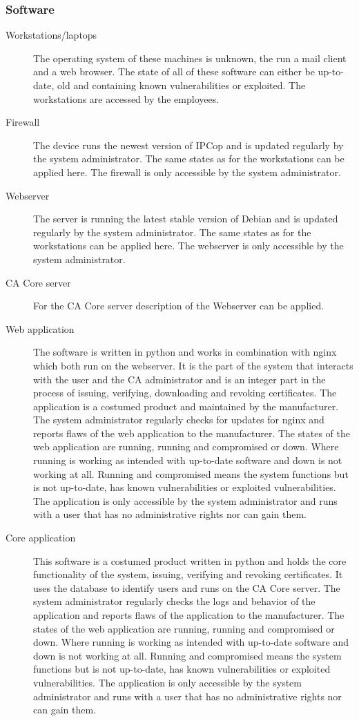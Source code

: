 \documentclass[a4paper, toc=index, 12pt, DIV14, twoside, BCOR2cm, headsepline, numbers=noenddot, bibliography=totoc]{scrbook}
\begin{document}
\subsubsection{Software}
\begin{description}
\item[Workstations/laptops ] The operating system of these machines is unknown, the run a mail client and a web browser. The state of all of these software can either be up-to-date, old and containing known vulnerabilities or exploited. The workstations are accessed by the employees.
\item[Firewall ] The device runs the newest version of IPCop and is updated regularly by the system administrator. The same states as for the workstations can be applied here. The firewall is only accessible by the system administrator.
\item[Webserver ] The server is running the latest stable version of Debian and is updated regularly by the system administrator. The same states as for the workstations can be applied here. The webserver is only accessible by the system administrator.
\item[CA Core server ] For the CA Core server description of the Webserver can be applied. 
\item[Web application ] The software is written in python and works in combination with nginx which both run on the webserver. It is the part of the system that interacts with the user and the CA administrator and is an integer part in the process of issuing, verifying, downloading and revoking certificates. The application is a costumed product and maintained by the manufacturer. The system administrator regularly checks for updates for nginx and reports flaws of the web application to the manufacturer. The states of the web application are running, running and compromised or down. Where running is working as intended with up-to-date software and down is not working at all. Running and compromised means the system functions but is not up-to-date, has known vulnerabilities or exploited vulnerabilities. The application is only accessible by the system administrator and runs with a user that has no administrative rights nor can gain them.
\item[Core application ] This software is a costumed product written in python and holds the core functionality of the system, issuing, verifying and revoking certificates. It uses the database to identify users and runs on the CA Core server. The system administrator regularly checks the logs and behavior of the application and reports flaws of the application to the manufacturer. The states of the web application are running, running and compromised or down. Where running is working as intended with up-to-date software and down is not working at all. Running and compromised means the system functions but is not up-to-date, has known vulnerabilities or exploited vulnerabilities. The application is only accessible by the system administrator and runs with a user that has no administrative rights nor can gain them.

\end{description}
\end{document}
